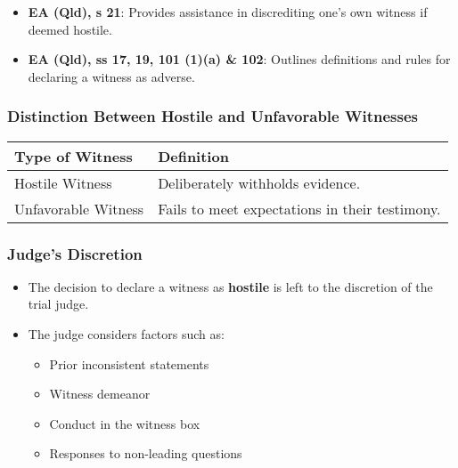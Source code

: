 \begin{itemize}
\tightlist
\item
  \textbf{EA (Qld), s 21}: Provides assistance in discrediting one's own
  witness if deemed hostile.
\item
  \textbf{EA (Qld), ss 17, 19, 101 (1)(a) \& 102}: Outlines definitions
  and rules for declaring a witness as adverse.
\end{itemize}

\subsubsection{Distinction Between Hostile and Unfavorable
Witnesses}\label{distinction-between-hostile-and-unfavorable-witnesses}

\begin{longtable}[]{@{}
  >{\raggedright\arraybackslash}p{}
  >{\raggedright\arraybackslash}p{}@{}}
\toprule\noalign{}
\begin{minipage}[b]{\linewidth}\raggedright
Type of Witness
\end{minipage} & \begin{minipage}[b]{\linewidth}\raggedright
Definition
\end{minipage} \\
\midrule\noalign{}
\endhead
\bottomrule\noalign{}
\endlastfoot
Hostile Witness & Deliberately withholds evidence. \\
Unfavorable Witness & Fails to meet expectations in their testimony. \\
\end{longtable}

\subsubsection{Judge's Discretion}\label{judges-discretion}

\begin{itemize}
\tightlist
\item
  The decision to declare a witness as \textbf{hostile} is left to the
  discretion of the trial judge.
\item
  The judge considers factors such as:

  \begin{itemize}
  \tightlist
  \item
    Prior inconsistent statements
  \item
    Witness demeanor
  \item
    Conduct in the witness box
  \item
    Responses to non-leading questions
  \end{itemize}
\end{itemize}

